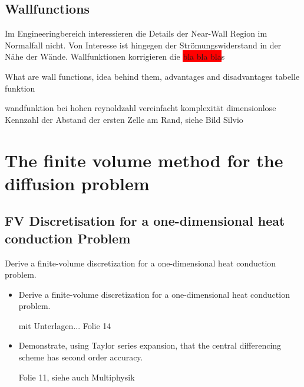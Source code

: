 \documentclass[a4paper]{scrartcl}
\begin{document}
\subsection{Wallfunctions} 
Im Engineeringbereich interessieren die Details der Near-Wall Region im
Normalfall nicht. Von Interesse ist hingegen der Strömungswiderstand in der Nähe
der Wände. Wallfunktionen korrigieren die \colorbox{red}{bla bla bla}s

What are wall functions, idea behind them, advantages
and disadvantages tabelle funktion


wandfunktion bei hohen reynoldzahl vereinfacht komplexität
dimensionlose Kennzahl der Abstand der ersten Zelle am Rand, siehe Bild Silvio



\section{The finite volume method for the diffusion problem}


\subsection{FV Discretisation for a one-dimensional heat conduction Problem}
Derive a finite-volume discretization for a one-dimensional heat conduction
problem. 


\begin{itemize}
\item Derive a finite-volume discretization for a one-dimensional heat conduction problem. 

mit Unterlagen... Folie 14

\item Demonstrate, using Taylor series expansion, that the central differencing scheme has second order accuracy.

Folie 11, siehe auch Multiphysik


\end{itemize}
\end{document}
